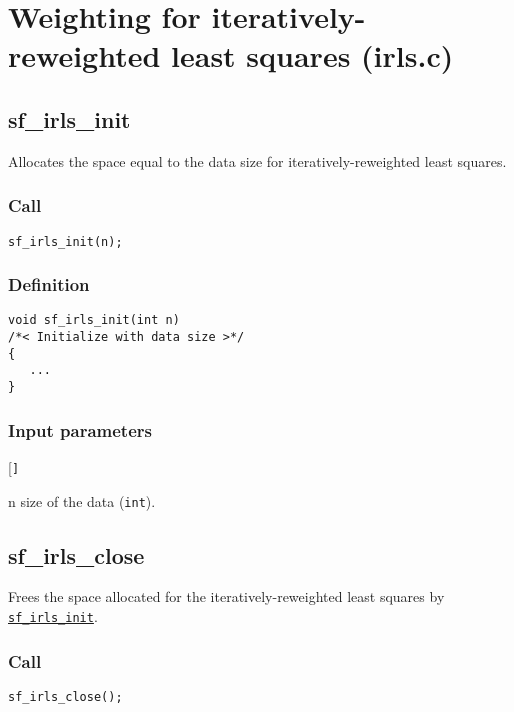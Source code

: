 \section{Weighting for iteratively-reweighted least squares (irls.c)}




\subsection{{sf\_irls\_init}}\label{sec:sf_irls_init}
Allocates the space equal to the data size for iteratively-reweighted least squares.

\subsubsection*{Call}
\begin{verbatim}sf_irls_init(n);\end{verbatim}

\subsubsection*{Definition}
\begin{verbatim}
void sf_irls_init(int n) 
/*< Initialize with data size >*/
{
   ...
}
\end{verbatim}

\subsubsection*{Input parameters}
\begin{desclist}{\tt }{\quad}[\tt ]
   \setlength\itemsep{0pt}
   \item[n] size of the data (\texttt{int}).  
\end{desclist}




\subsection{{sf\_irls\_close}}
Frees the space allocated for the iteratively-reweighted least squares by \hyperref[sec:sf_irls_init]{\texttt{sf\_irls\_init}}.

\subsubsection*{Call}
\begin{verbatim}sf_irls_close();\end{verbatim}

